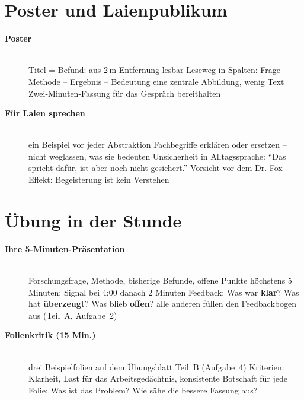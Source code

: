 \section{Poster und Laienpublikum}
\begin{description}
\item[{\rot\bf Poster}]~\\[-\lblskip]
\bi
  \ite Titel = Befund: aus 2\,m Entfernung lesbar
  \ite Leseweg in Spalten: Frage -- Methode -- Ergebnis -- Bedeutung
  \ite eine zentrale Abbildung, wenig Text
  \ite Zwei-Minuten-Fassung für das Gespräch bereithalten
\ei
\os{\newpage}

\item[{\rot\bf Für Laien sprechen}]~\\[-\lblskip]
\bi
  \ite ein Beispiel vor jeder Abstraktion
  \ite Fachbegriffe erklären oder ersetzen -- nicht weglassen, was sie
    bedeuten
  \ite Unsicherheit in Alltagssprache: \enquote{Das spricht dafür, ist
    aber noch nicht gesichert.}
  \ite Vorsicht vor dem Dr.-Fox-Effekt: Begeisterung ist kein Verstehen
\ei
\os{\newpage}
\end{description}

\section{Übung in der Stunde}
\label{sec:le12-praes}
\begin{description}
\item[{\rot\bf Ihre 5-Minuten-Präsentation}]~\\[-\lblskip]
\bi
  \ite Forschungsfrage, Methode, bisherige Befunde, offene Punkte
  \ite höchstens 5 Minuten; Signal bei 4:00
  \ite danach 2 Minuten Feedback: Was war \textbf{klar}? Was hat
    \textbf{überzeugt}? Was blieb \textbf{offen}?
  \ite alle anderen füllen den Feedbackbogen aus (Teil~A, Aufgabe~2)
\ei
\os{\newpage}

\item[{\rot\bf Folienkritik (15 Min.)}]~\\[-\lblskip]
\bi
  \ite drei Beispielfolien auf dem Übungsblatt Teil~B (Aufgabe~4)
  \ite Kriterien: Klarheit, Last für das Arbeitsgedächtnis, konsistente
    Botschaft
  \ite für jede Folie: Was ist das Problem? Wie sähe die bessere Fassung
    aus?
\ei
\os{\newpage}
\end{description}

